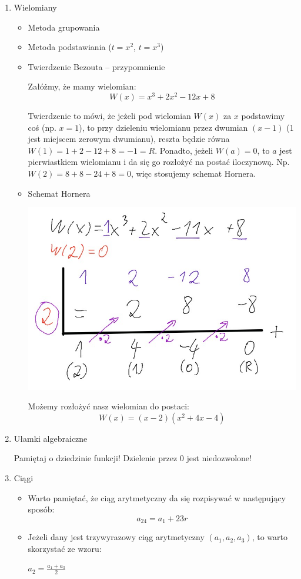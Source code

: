 \documentclass[12pt,a4paper]{article}
\theoremstyle{break}
\newcommand{\Wzor}[1]{
		\begin{mdframed}[style=wzor]
			\centering #1
		\end{mdframed}
	}
\begin{document}
\begin{enumerate}[1)]
	\item {\large Wielomiany}
	\begin{itemize}
		\item Metoda grupowania
		\item Metoda podstawiania ($t=x^2$, $t=x^3$)
		\item Twierdzenie Bezouta – przypomnienie
		
		Załóżmy, że mamy wielomian:
		$$W(x) = x^3 + 2x^2 - 12x + 8$$
		
		Twierdzenie to mówi, że jeżeli pod wielomian $W(x)$ za $x$ podstawimy coś (np. $x=1$), to przy dzieleniu wielomianu przez dwumian $(x-1)$ (1 jest miejscem zerowym dwumianu), reszta będzie równa $W(1)=1+2-12+8=-1=R$. Ponadto, jeżeli $W(a)=0$, to $a$ jest pierwiastkiem wielomianu i da się go rozłożyć na postać iloczynową. Np. $W(2)=8+8-24+8=0$, więc stosujemy schemat Hornera.
		
		\item Schemat Hornera
		
		\begin{center}
			\includegraphics[scale=0.5]{r3.jpeg}
		\end{center}
		Możemy rozłożyć nasz wielomian do postaci:
		$$W(x)=(x-2)(x^2+4x-4)$$
		
	\end{itemize}
	
	\item {\large Ułamki algebraiczne}
	
	Pamiętaj o dziedzinie funkcji! Dzielenie przez 0 jest niedozwolone!
	
	\item {\large Ciągi}
	\begin{itemize}
		\item Warto pamiętać, że ciąg arytmetyczny da się rozpisywać w następujący sposób:
		$$a_{24} = a_1 + 23r$$
		
		\item Jeżeli dany jest trzywyrazowy ciąg arytmetyczny $(a_1,a_2,a_3)$, to warto skorzystać ze wzoru:
		\Wzor{$a_2=\frac{a_1+a_3}{2}$}
	\end{itemize}
\end{enumerate}
\end{document}
